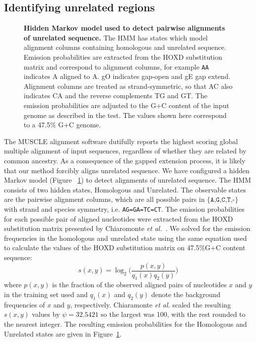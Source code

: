 \documentclass{llncs}
\begin{document}
\subsection{Identifying unrelated regions}
\begin{figure}[t]
\centering {}
\caption{\textbf{Hidden Markov model used to detect pairwise alignments of unrelated
sequence.} The HMM has states which model alignment columns containing
homologous and unrelated sequence. Emission probabilities are extracted from the HOXD substitution matrix and correspond to alignment
columns, for example \texttt{AA} indicates A aligned to A.  gO
indicates gap-open and gE gap extend. Alignment columns are treated as
strand-symmetric, so that AC also indicates CA and the reverse
complements TG and GT.  The emission probabilities are adjusted to the G+C content of the input genome
as described in the test.  The values shown here correspond to a 47.5\% G+C genome.}
\label{fig-hmm}\vspace{-0.2cm}
\end{figure}
The MUSCLE alignment software dutifully reports the highest scoring
global multiple alignment of input sequences, regardless of whether
they are related by common ancestry. As a consequence of the gapped
extension process, it is likely that our method forcibly aligns unrelated
sequence. We have configured a hidden Markov model (Figure
~\ref{fig-hmm}) to detect alignments of unrelated sequence. The HMM
consists of two hidden states, Homologous and Unrelated. The
observable states are the pairwise alignment columns, which are all
possible pairs in $\texttt{{\{A,G,C,T,-\}}}$ with strand and species
symmetry, i.e. \texttt{AG=GA=TC=CT}. The emission probabilities for
each possible pair of aligned nucleotides were extracted from the HOXD
substitution matrix presented by Chiaromonte \textit{et al.}~\cite{hoxd}.
We solved for the emission frequencies in the
homologous and unrelated state using the same equation used to
calculate the values of the HOXD substitution matrix on 47.5\%G+C
content sequence\cite{hoxd}:
\begin{equation}
s(x,y)= \log_{2}{\Bigg(\frac{p(x,y)}{q_{1}(x)q_{2}(y)}\Bigg)}
\end{equation}
{w}here $p(x,y)$ is the fraction of the observed aligned pairs of
nucleotides $x$ and $y$ in the training set used and $q_{1}(x)$ and
$q_{2}(y)$ denote the background frequencies of $x$ and $y$,
respectively. Chiaramonte \textit{et al.} scaled the resulting
$s(x,y)$ values by $\psi=32.5421$ so the largest was 100,
with the rest rounded to the nearest integer.  The resulting emission
probabilities for the Homologous and Unrelated states are given
in Figure~\ref{fig-hmm}.
\end{document}
